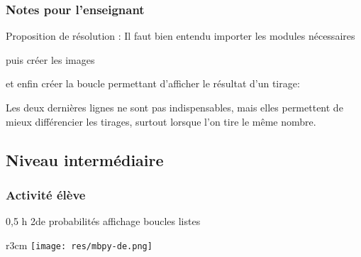 \subsubsection{Notes pour l'enseignant}

%
%
\begin{methode}
Proposition de résolution :
Il faut bien entendu importer les modules nécessaires

puis créer les images


et enfin créer la boucle permettant d'afficher le résultat d'un tirage:
\end{methode}


\begin{remarque}
   Les deux dernières lignes ne sont pas indispensables, mais elles permettent de mieux différencier les tirages, surtout lorsque l'on tire le même nombre.
\end{remarque}


%
%

\newpage

\subsection{Niveau intermédiaire}

\subsubsection{Activité élève}

\cartouche
{0,5 h}         %
{2de}           %
{probabilités}        %
{}     %
{affichage boucles listes }       %


\begin{wrapfigure}[5]{r}{3cm}
    \texttt{[image: res/mbpy-de.png]}
\end{wrapfigure}

